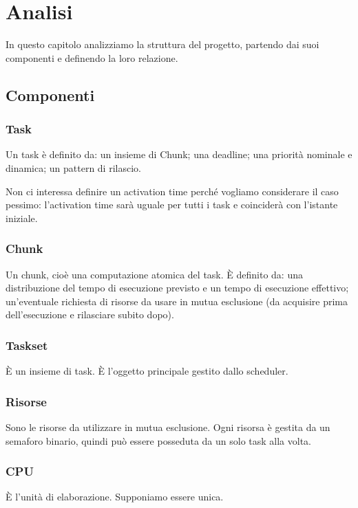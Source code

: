 \chapter{Analisi}
In questo capitolo analizziamo la struttura del progetto, partendo dai suoi componenti e definendo la loro relazione.

\section{Componenti}

\subsection{Task}
Un task è definito da: un insieme di Chunk; una deadline; una priorità nominale e dinamica; un pattern di rilascio.

Non ci interessa definire un activation time perché vogliamo considerare il caso pessimo: l'activation time sarà uguale per tutti i task e coinciderà con l'istante iniziale.

\subsection{Chunk}
Un chunk, cioè una computazione atomica del task. È definito da: una distribuzione del tempo di esecuzione previsto e un tempo di esecuzione effettivo; un'eventuale richiesta di risorse da usare in mutua esclusione (da acquisire prima dell'esecuzione e rilasciare subito dopo).

\subsection{Taskset}
È un insieme di task. È l'oggetto principale gestito dallo scheduler.

\subsection{Risorse}
Sono le risorse da utilizzare in mutua esclusione. Ogni risorsa è gestita da un semaforo binario, quindi può essere posseduta da un solo task alla volta.

\subsection{CPU}
È l'unità di elaborazione. Supponiamo essere unica.

